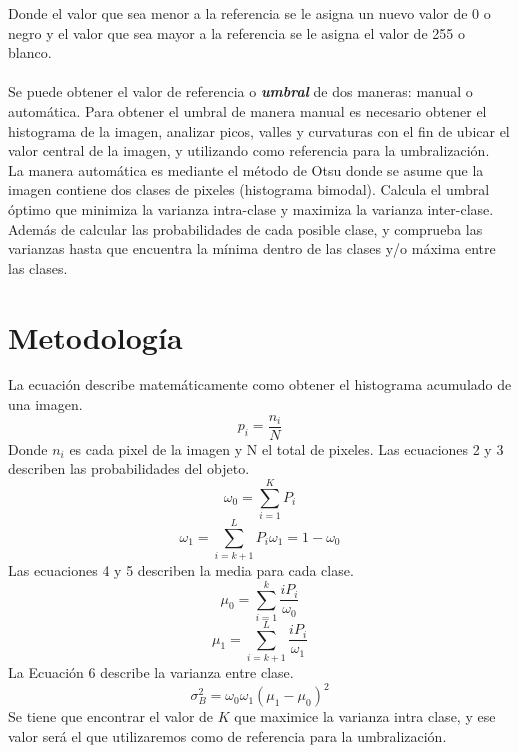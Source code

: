 \documentclass[conference]{IEEEtran}
\begin{document}
Donde el valor que sea menor a la referencia se le asigna un nuevo valor de 0 o negro y el valor que sea mayor a la referencia se le asigna el valor de 255 o blanco.\\\\

Se puede obtener el valor de referencia o \textbf{\emph{umbral}} de dos maneras: manual o autom\'atica. Para obtener el umbral de manera manual es necesario obtener el histograma de la imagen, analizar picos, valles y curvaturas con el fin de ubicar el valor central de la imagen, y utilizando como referencia para la umbralizaci\'on.\\
La manera autom\'atica es mediante el m\'etodo de Otsu donde se asume que la imagen contiene dos clases de pixeles (histograma bimodal). Calcula el umbral \'optimo que minimiza la varianza intra-clase y maximiza la varianza inter-clase. Adem\'as de calcular las probabilidades de cada posible clase, y comprueba las varianzas hasta que encuentra la m\'inima dentro de las clases y/o m\'axima entre las clases.\\

\section{Metodolog\'ia}
La ecuaci\'on describe matem\'aticamente como obtener el histograma acumulado de una imagen.\\
\begin{equation}
p_i = \frac{n_i}{N}
\end{equation}
Donde $n_i$ es cada pixel de la imagen y N el total de pixeles.
Las ecuaciones 2 y 3 describen las probabilidades del objeto.
\begin{equation}
\omega_0 = \sum_{i=1}^{K}P_i
\end{equation}
\begin{equation}
\omega_1 = \sum_{i=k+1}^{L}P_i
\omega_1 = 1 - \omega_0
\end{equation}
Las ecuaciones 4 y 5 describen la media para cada clase.
\begin{equation}
\mu_0 = \sum_{i=1}^{k}\frac{iP_i}{\omega_0} 
\end{equation}
\begin{equation}
\mu_1 = \sum_{i=k+1}^{L}\frac{iP_i}{\omega_1}
\end{equation}
La Ecuaci\'on 6 describe la varianza entre clase.
\begin{equation}
\sigma_{B}^{2} = \omega_0\omega_1(\mu_1 - \mu_0)^2
\end{equation}
Se tiene que encontrar el valor de $K$ que maximice la varianza intra clase, y ese valor ser\'a el que utilizaremos como de referencia para la umbralizaci\'on.
\end{document}
